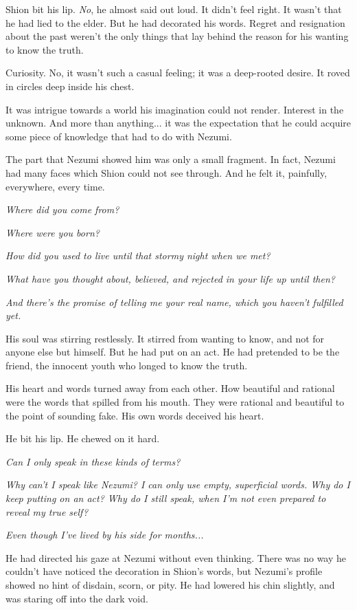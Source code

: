 Shion bit his lip. \emph{No}, he almost said out loud. It didn't feel right. It
wasn't that he had lied to the elder. But he had decorated his words.
Regret and resignation about the past weren't the only things that lay
behind the reason for his wanting to know the truth.

Curiosity. No, it wasn't such a casual feeling; it was a deep-rooted
desire. It roved in circles deep inside his chest.

It was intrigue towards a world his imagination could not render.
Interest in the unknown. And more than anything... it was the
expectation that he could acquire some piece of knowledge that had to do
with Nezumi.

The part that Nezumi showed him was only a small fragment. In fact,
Nezumi had many faces which Shion could not see through. And he felt it,
painfully, everywhere, every time.

\emph{Where did you come from?}

\emph{Where were you born?}

\emph{How did you used to live until that stormy night when we met?}

\emph{What have you thought about, believed, and rejected in your life up
until then?}

\emph{And there's the promise of telling me your real name, which you haven't
fulfilled yet.}

His soul was stirring restlessly. It stirred from wanting to know, and
not for anyone else but himself. But he had put on an act. He had
pretended to be the friend, the innocent youth who longed to know the
truth.

His heart and words turned away from each other. How beautiful and
rational were the words that spilled from his mouth. They were rational
and beautiful to the point of sounding fake. His own words deceived his
heart.

He bit his lip. He chewed on it hard.

\emph{Can I only speak in these kinds of terms?}

\emph{Why can't I speak like Nezumi? I can only use empty, superficial words.
Why do I keep putting on an act? Why do I still speak, when I'm not even
prepared to reveal my true self?}

\emph{Even though I've lived by his side for months...}

He had directed his gaze at Nezumi without even thinking. There was no
way he couldn't have noticed the decoration in Shion's words, but
Nezumi's profile showed no hint of disdain, scorn, or pity. He had
lowered his chin slightly, and was staring off into the dark void.

